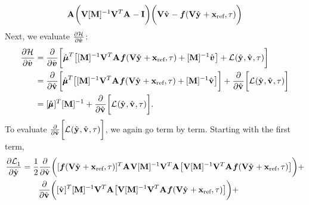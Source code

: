 \documentclass[3p,computermodern,10pt]{elsarticle}
\begin{document}
\begin{appendices}
\begin{equation*}
  \mathbf{A}^{} \bigg(  \mathbf {V}  [\mathbf{M}]^{-1}\mathbf {V}^T  \mathbf{A}^{}- \mathbf{I} \bigg)
 \bigg( \mathbf {V} \hat{\mathbf{v}}^{} - \boldsymbol f(\mathbf {V} \hat{\mathbf{y}}^{} + \mathbf{x}_\text{ref},\tau) \bigg) 
\end{equation*}
Next, we evaluate $\frac{\partial \mathcal{H}^{}}{\partial \hat{\boldsymbol v}^{}}$:
\begin{align}
  \frac{\partial \mathcal{H}^{}}{\partial \hat{\boldsymbol v}^{}{}} &= \frac{\partial}{\partial \hat{\boldsymbol v}^{}{}} \bigg[  \hat{\boldsymbol \mu}^{T} \big[  [\mathbf{M}]^{-1}\mathbf {V}^T \mathbf{A}^{}\boldsymbol f(\mathbf {V} \hat{\mathbf{y}}^{} + \mathbf{x}_\text{ref},\tau) + [\mathbf{M}]^{-1}\hat{\boldsymbol v}^{} \big] +  \mathcal{L}^{}(\hat{\mathbf{y}}^{},\hat{\mathbf{v}}^{},\tau) \bigg] \\
 &= \frac{\partial}{\partial \hat{\mathbf{v}}^{}{}} \bigg[  \hat{\pmb \mu}^{T} \big[  [\mathbf{M}]^{-1}\mathbf {V}^T \mathbf{A}^{}\boldsymbol f(\mathbf {V} \hat{\mathbf{y}}^{} + \mathbf{x}_\text{ref},\tau) + [\mathbf{M}]^{-1}\hat{\mathbf{v}}^{} \big] \bigg]+  \frac{\partial}{\partial \hat{\mathbf{v}}^{}{}}  \bigg[ \mathcal{L}^{}(\hat{\mathbf{y}}^{},\hat{\mathbf{v}}^{},\tau) \bigg] \\
 &= [\hat{\pmb \mu}^{}]^T[\mathbf{M}]^{-1} + \frac{\partial}{\partial \hat{\mathbf{v}}^{}{}}  \bigg[ \mathcal{L}^{}(\hat{\mathbf{y}}^{},\hat{\mathbf{v}}^{},\tau) \bigg]. 
\end{align}
To evaluate $\frac{\partial}{\partial \hat{\mathbf{v}}^{}{}}  \bigg[ \mathcal{L}^{}(\hat{\mathbf{y}}^{},\hat{\mathbf{v}}^{},\tau) \bigg]$, we again 
go term by term. Starting with the first term,
\begin{align*}
\frac{\partial  \objectiveControlArg{}_1 }{\partial \genstateyDiscreteArgnt{}{}} &= 
\frac{1}{2} \frac{\partial }{\partial \controllerDiscreteDumArgnt{}} \bigg( [\velocity(\veloargsromy)]^T \stweightingMatArg{} \basisspace [\massArgnt{}]^{-1} \basisspace^T \stweightingMatArg{}  \big[ \basisspace  [\massArgnt{}]^{-1}\basisspace^T
\stweightingMatArg{}  \velocity(\veloargsromy) \big] \bigg) + \\
& \qquad \frac{\partial }{\partial \controllerDiscreteDumArgnt{}{}} \bigg( [\controllerDiscreteDumArgnt{}]^T [\massArgnt{}]^{-1} \basisspace^T \stweightingMatArg{}  \big[ \basisspace  [\massArgnt{}]^{-1}\basisspace^T
\stweightingMatArg{}  \velocity(\veloargsromy) \big] \bigg) + \\

\end{align*}
\end{appendices}
\end{document}

